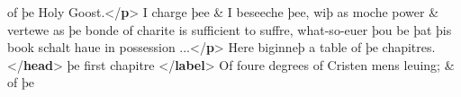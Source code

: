 \begin{shaded}
\hspace*{1em}\hspace*{1em}\hspace*{1em}\hspace*{1em} of þe Holy Goost.{</\textbf{p}>}\mbox{}\newline 
\hspace*{1em}I charge þee \& I beseeche þee, wiþ as moche\mbox{}\newline 
\hspace*{1em}\hspace*{1em}\hspace*{1em}\hspace*{1em} power \& vertewe as þe bonde of charite is sufficient\mbox{}\newline 
\hspace*{1em}\hspace*{1em}\hspace*{1em}\hspace*{1em} to suffre, what-so-euer þou be þat þis book schalt\mbox{}\newline 
\hspace*{1em}\hspace*{1em}\hspace*{1em}\hspace*{1em} haue in possession ...{</\textbf{p}>}\mbox{}\newline 
{}\mbox{}\newline 
{}\mbox{}\newline 
\hspace*{1em}Here biginneþ a table of þe chapitres.{</\textbf{head}>}\mbox{}\newline 
\hspace*{1em}\mbox{}\newline 
\hspace*{1em}\hspace*{1em}þe first chapitre {</\textbf{label}>}\mbox{}\newline 
\hspace*{1em}\hspace*{1em}Of foure degrees of Cristen mens leuing; \& of þe\mbox{}\newline 

\end{shaded}

